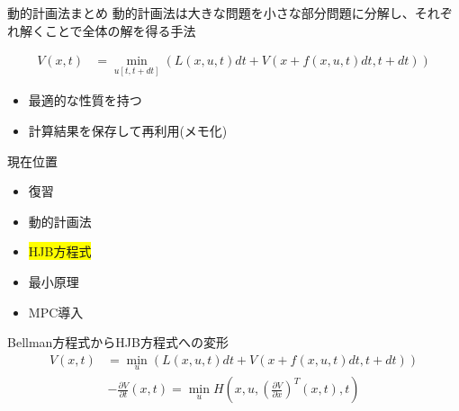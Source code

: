 \documentclass[dvipdfmx,12pt]{beamer}
\begin{document}
    \begin{frame}{動的計画法まとめ}
        動的計画法は大きな問題を小さな部分問題に分解し、それぞれ解くことで全体の解を得る手法

        \begin{tcolorbox}[title=Bellman方程式]
            \begin{align*}
                V(x, t) &= \min_{u[t, t+dt]} \left( L(x, u, t) dt + V \left( x + f(x, u, t) dt, t + dt \right) \right)
            \end{align*}
        \end{tcolorbox}

        \begin{itemize}
            \item 最適的な性質を持つ
            \item 計算結果を保存して再利用(メモ化)
        \end{itemize}
    \end{frame}

    \begin{frame}{現在位置}
        \footnotesize
        \begin{itemize}
            \item 復習
            \item 動的計画法
            \item \colorbox{yellow}{HJB方程式}
            \item 最小原理
            \item MPC導入
        \end{itemize}
        \begin{itembox}[l]{Bellman方程式からHJB方程式への変形}
            \begin{align*}
                V(x, t) &= \min_u \left( L(x, u, t) dt + V \left( x + f(x, u, t) dt, t + dt \right) \right)        
            \end{align*}
            \begin{align*}
                -\frac{\partial V}{\partial t}\left(x,t\right) = \min _u H\left(x, u, \left( \frac{\partial V}{\partial x} \right)^T\left(x, t\right), t \right)
            \end{align*}
        \end{itembox}
    \end{frame}
\end{document}
